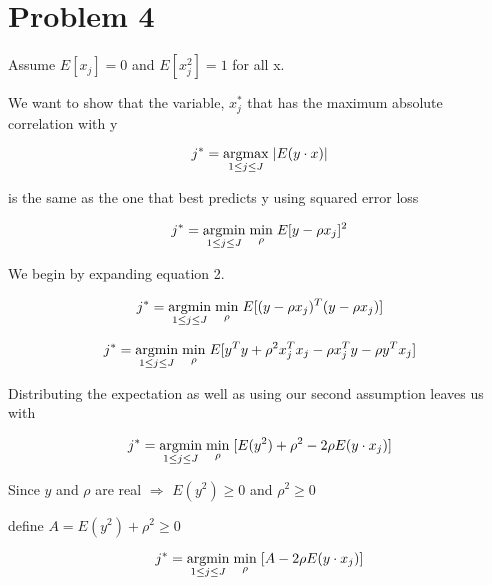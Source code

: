 \documentclass[11pt]{article}
\begin{document}
\section*{Problem 4}

Assume $E[x_j] = 0$ and $E[x_j^2] = 1$ for all x.

We want to show that the variable, $x_j^*$ that has the maximum absolute 
correlation with y 

\begin{equation}
j^* = \underset{1 \leq j \leq J}{\operatorname{argmax}}\hspace{1mm}|E(y \cdot x)|
\end{equation}

is the same as the one that best predicts y using squared error loss

\begin{equation}
j^* = \underset{1 \leq j \leq J}{\operatorname{argmin}} 
\hspace{1mm} \underset{\rho}{\operatorname{min}} \hspace{1mm} E[y - \rho x_j]^2
\end{equation}

We begin by expanding equation 2. 

$$j^* = \underset{1 \leq j \leq J}{\operatorname{argmin}} 
\hspace{1mm} \underset{\rho}{\operatorname{min}} 
\hspace{1mm} E[(y - \rho x_j)^T ( y- \rho x_j)]$$ 

$$j^* = \underset{1 \leq j \leq J}{\operatorname{argmin}} 
\hspace{1mm} \underset{\rho}{\operatorname{min}} 
\hspace{1mm} E[y^Ty + \rho^2 x_j^T x_j - \rho x_j^T y - \rho y^T x_j]$$ 

Distributing the expectation as well as using our second assumption leaves us 
with

$$j^* = \underset{1 \leq j \leq J}{\operatorname{argmin}} 
\hspace{1mm} \underset{\rho}{\operatorname{min}} 
\hspace{1mm} [E(y^2) + \rho^2 - 2 \rho E(y \cdot x_j)]$$

Since $y$ and $\rho$ are real $\Rightarrow$ $E(y^2) \geq 0$ and $\rho^2 \geq 0$ 

define $A = E(y^2) + \rho^2 \geq 0$

$$j^* = \underset{1 \leq j \leq J}{\operatorname{argmin}} 
\hspace{1mm} \underset{\rho}{\operatorname{min}} 
\hspace{1mm} [A - 2 \rho E(y \cdot x_j)]$$
\end{document}

